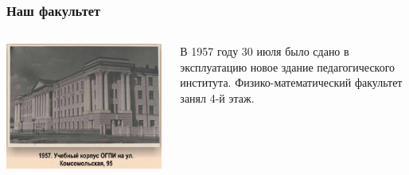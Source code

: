\documentclass{beamer}
\begin{document}
\begin{frame}
\frametitle{Наш факультет}

\begin{columns}
  \begin{column}{0.5\textwidth}
    \centering
    \includegraphics[width=0.99\textwidth]{фото вуза 2 слайд.jpg}
    \textit{}
  \end{column}
  \begin{column}{0.5\textwidth}
    \large В 1957 году 30 июля было сдано в эксплуатацию новое здание педагогического института. Физико-математический факультет занял 4-й этаж.
  \end{column}
\end{columns}
\end{frame}
\end{document}
